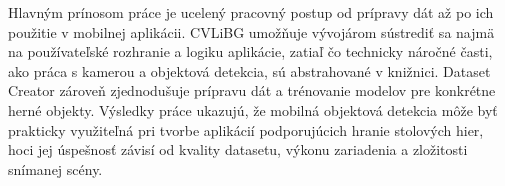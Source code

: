 Hlavným prínosom práce je ucelený pracovný postup od prípravy dát až po ich použitie v mobilnej aplikácii. CVLiBG umožňuje vývojárom sústrediť sa najmä na používateľské rozhranie a logiku aplikácie, zatiaľ čo technicky náročné časti, ako práca s kamerou a objektová detekcia, sú abstrahované v knižnici. Dataset Creator zároveň zjednodušuje prípravu dát a trénovanie modelov pre konkrétne herné objekty. Výsledky práce ukazujú, že mobilná objektová detekcia môže byť prakticky využiteľná pri tvorbe aplikácií podporujúcich hranie stolových hier, hoci jej úspešnosť závisí od kvality datasetu, výkonu zariadenia a zložitosti snímanej scény.